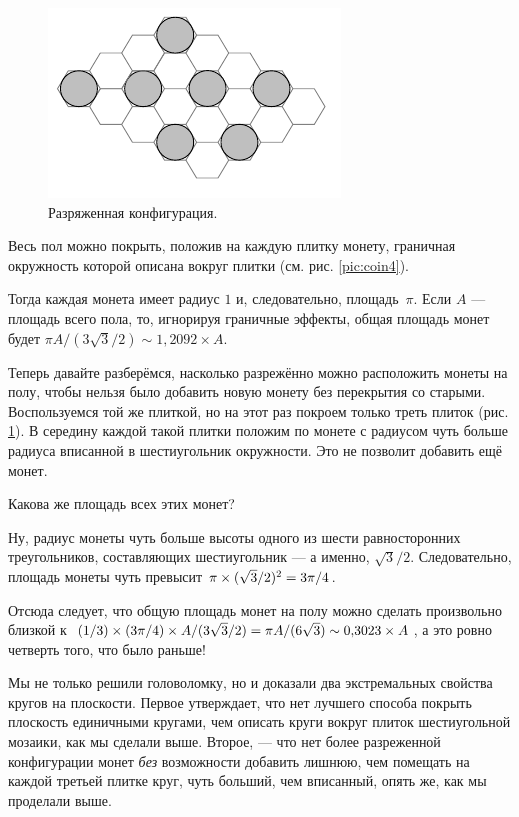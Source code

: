 \begin{figure}[b!]
\centering
\includegraphics[scale=1]{pics/coin5}
\caption{Разряженная конфигурация.}
\label{pic:coin5}
\end{figure}

Весь пол можно покрыть, положив на каждую плитку монету, граничная окружность которой описана вокруг плитки (см. рис. \ref{pic:coin4}).

Тогда каждая монета имеет радиус $1$ и, следовательно, площадь~$\pi$.
Если $A$ --- площадь всего пола, то, игнорируя граничные эффекты, общая площадь монет будет $\pi A/(3\sqrt{3}/2)\sim 1{,}2092\times A$.

Теперь давайте разберёмся, насколько разрежённо можно расположить монеты на полу, чтобы нельзя было добавить новую монету без перекрытия со старыми.
Воспользуемся той же плиткой, но на этот раз покроем только треть плиток (рис. \ref{pic:coin5}).
В середину каждой такой плитки положим по монете с радиусом чуть больше радиуса вписанной в шестиугольник окружности. 
Это не позволит добавить ещё монет.

Какова же площадь всех этих монет?

Ну, радиус монеты чуть больше высоты одного из шести равносторонних треугольников, составляющих шестиугольник — а именно, $\sqrt{3}/2$.
Следовательно, площадь монеты чуть превысит $\pi \z\times (\sqrt{3}/2)^2 \z= 3\pi/4$.

Отсюда следует, что общую площадь монет на полу можно сделать произвольно близкой к $(1/3) \times (3\pi/4) \times A/(3\sqrt{3}/2) = \pi A/(6 \sqrt{3}) \z\sim 0{,}3023 \times A$, а это ровно четверть того, что было раньше!

\medskip

Мы не только решили головоломку, но и доказали два экстремальных свойства кругов на плоскости.
Первое утверждает, что нет лучшего способа покрыть плоскость единичными кругами, чем описать круги вокруг плиток шестиугольной мозаики, как мы сделали выше.
Второе, --- что нет более разреженной конфигурации монет \emph{без} возможности добавить лишнюю, чем помещать на каждой третьей плитке круг, чуть больший, чем вписанный, опять же, как мы проделали выше.

